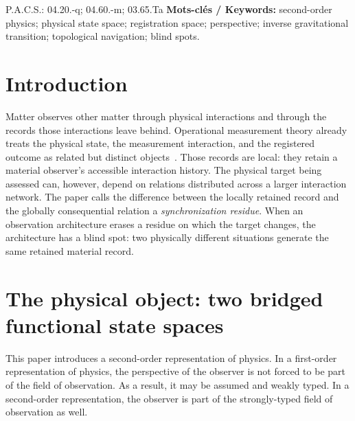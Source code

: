 \documentclass[10pt,twoside,a5paper]{article}
\def\pacs#1{\LP P.A.C.S.: #1}
\theoremstyle{definition}
\begin{document}
\pacs{04.20.-q; 04.60.-m; 03.65.Ta}
\noindent\textbf{Mots-cl\'es / Keywords:} second-order physics; physical state space; registration space; perspective; inverse gravitational transition; topological navigation; blind spots.

\section{Introduction}
\label{sec:intro}

Matter observes other matter through physical interactions and through the records
those interactions leave behind. Operational measurement theory already treats the
physical state, the measurement interaction, and the registered outcome as related but
distinct objects~\cite{DaviesLewis1970,Ozawa1984}. Those records are local: they retain a material
observer's accessible interaction history. The physical target being assessed can,
however, depend on relations distributed across a larger interaction network. The
paper calls the difference between the locally retained record and the globally
consequential relation a \emph{synchronization residue}. When an observation
architecture erases a residue on which the target changes, the architecture has a
blind spot: two physically different situations generate the same retained material
record.

\section{The physical object: two bridged functional state spaces}
\label{sec:object}

This paper introduces a second-order representation of physics. In a first-order representation of physics, the perspective of the observer is not forced to be part of the field of observation. As a result, it may be assumed and weakly typed. In a second-order representation, the observer is part of the strongly-typed field of observation as well.
\end{document}
